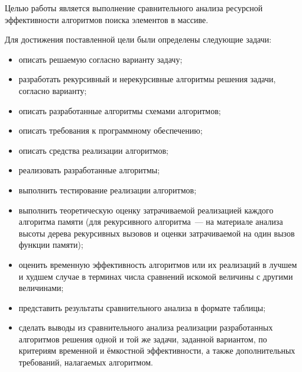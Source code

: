
Целью работы является выполнение сравнительного анализа ресурсной эффективности алгоритмов поиска элементов в массиве.

Для достижения поставленной цели были определены следующие задачи:
\begin{itemize}
	\item описать решаемую согласно варианту задачу;
	\item разработать рекурсивный и нерекурсивные алгоритмы решения задачи, согласно варианту;
	\item описать разработанные алгоритмы схемами алгоритмов;
	\item описать требования к программному обеспечению;
	\item описать средства реализации алгоритмов;
	\item реализовать разработанные алгоритмы;
	\item выполнить тестирование реализации алгоритмов;
	\item выполнить теоретическую оценку затрачиваемой реализацией каждого алгоритма памяти (для рекурсивного алгоритма~--- на материале анализа высоты дерева рекурсивных вызовов и оценки затрачиваемой на один вызов функции памяти);
	\item оценить временную эффективность алгоритмов или их реализаций в лучшем и худшем случае в терминах числа сравнений искомой величины с другими величинами;
	\item представить результаты сравнительного анализа в формате таблицы;
	\item сделать выводы из сравнительного анализа реализации разработанных алгоритмов решения одной и той же задачи, заданной вариантом, по критериям временной и ёмкостной эффективности, а также дополнительных требований, налагаемых алгоритмом.
\end{itemize}
